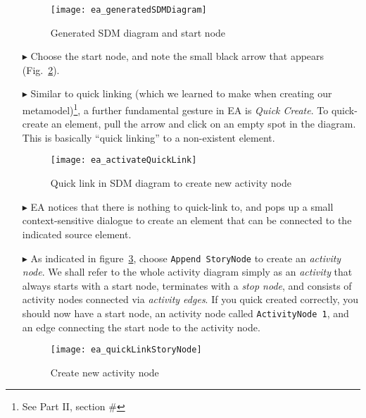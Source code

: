 \begin{itemize}
\begin{figure}[htp]
\begin{center}
  \texttt{[image: ea\_generatedSDMDiagram]}
  \caption{Generated SDM diagram and start node}  
  \label{fig:sdm_skeleton}
\end{center}
\end{figure}

\item[$\blacktriangleright$] Choose the start node, and note the small black arrow that appears (Fig.~\ref{fig:sdm_quicklink}).

\item[$\blacktriangleright$] Similar to quick linking (which we learned to make when creating our metamodel)\footnote{See Part II, section \#}, a further
fundamental gesture in EA is \emph{Quick Create}. To quick-create an element, pull the arrow and click on an empty spot in the diagram. This is basically
``quick linking'' to a non-existent element.

\begin{figure}[htp]
\begin{center}
  \texttt{[image: ea\_activateQuickLink]}
  \caption{Quick link in SDM diagram to create new activity node}  
  \label{fig:sdm_quicklink}
\end{center}
\end{figure}

\item[$\blacktriangleright$] EA notices that there is nothing to quick-link to, and pops up a small context-sensitive dialogue to create an element that can be
connected to the indicated source element.

\item[$\blacktriangleright$] As indicated in figure~\ref{fig:sdm_new_activity_node}, choose \texttt{Append StoryNode} to create an \emph{activity
node}. We shall refer to the whole activity diagram simply as an \emph{activity} that always starts with a start node,
terminates with a \emph{stop node}, and consists of activity nodes connected via \emph{activity edges}. If you quick created correctly, you
should now have a start node, an activity node called \texttt{ActivityNode 1}, and an edge connecting the start node to the activity node.

\begin{figure}[htp]
\begin{center}
  \texttt{[image: ea\_quickLinkStoryNode]}
  \caption{Create new activity node}  
  \label{fig:sdm_new_activity_node}
\end{center}
\end{figure}


\end{itemize}
